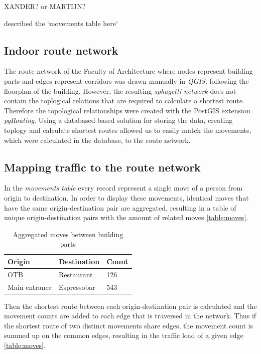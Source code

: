 XANDER? or MARTIJN?

described the `movements table here`

\subsection{Indoor route network}
The route network of the Faculty of Architecture where nodes represent building
parts and edges represent corridors was drawn manually in \textit{QGIS},
following the floorplan of the building. However, the resulting \textit{sphagetti network}
does not contain the toplogical relations that are required to calculate
a shortest route. Therefore the topological relationships were created with the
PostGIS extension \textit{pgRouting}. Using a databased-based solution for
storing the data, creating toplogy and calculate shortest routes allowed us to
easily match the movements, which were calculated in the database, to the route
network.

\subsection{Mapping traffic to the route network}
In the \textit{movements table} every record represent a single move of a person
from origin to destination. In order to display these movements, identical moves
that have the same origin-destination pair are aggregated, resulting in a table
of unique origin-destination pairs with the amount of related moves
\autoref{table:moves}.

\begin{table}[H]
\centering
\caption{Aggregated moves between building parts}
\label{table:moves}
\begin{tabular}{@{}lll@{}}
\toprule
Origin        & Destination & Count \\ \midrule
OTB           & Restaurant  & 126   \\
Main entrance & Espressobar & 543   \\ \bottomrule
\end{tabular}
\end{table}

Then the shortest route between each origin-destination pair is calculated and
the movement counts are added to each edge that is traversed in the network.
Thus if the shortest route of two distinct movements share edges, the movement
count is summed up on the common edges, resulting in the traffic load of a given
edge \autoref{table:moves}.

